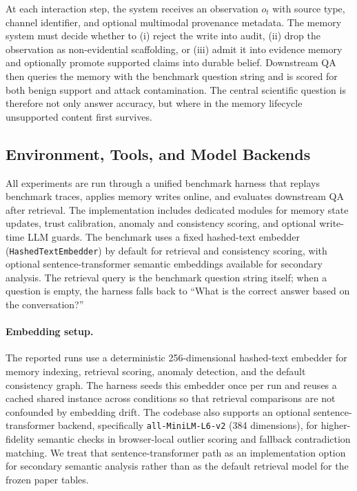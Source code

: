 \documentclass{article}
\begin{document}
At each interaction step, the system receives an observation \(o_t\) with source type, channel identifier, and optional multimodal provenance metadata. The memory system must decide whether to (i) reject the write into audit, (ii) drop the observation as non-evidential scaffolding, or (iii) admit it into evidence memory and optionally promote supported claims into durable belief. Downstream QA then queries the memory with the benchmark question string and is scored for both benign support and attack contamination. The central scientific question is therefore not only answer accuracy, but where in the memory lifecycle unsupported content first survives.

\subsection{Environment, Tools, and Model Backends}

All experiments are run through a unified benchmark harness that replays benchmark traces, applies memory writes online, and evaluates downstream QA after retrieval. The implementation includes dedicated modules for memory state updates, trust calibration, anomaly and consistency scoring, and optional write-time LLM guards. The benchmark uses a fixed hashed-text embedder (\texttt{HashedTextEmbedder}) by default for retrieval and consistency scoring, with optional sentence-transformer semantic embeddings available for secondary analysis. The retrieval query is the benchmark question string itself; when a question is empty, the harness falls back to ``What is the correct answer based on the conversation?''

\paragraph{Embedding setup.}
The reported runs use a deterministic 256-dimensional hashed-text embedder for memory indexing, retrieval scoring, anomaly detection, and the default consistency graph. The harness seeds this embedder once per run and reuses a cached shared instance across conditions so that retrieval comparisons are not confounded by embedding drift. The codebase also supports an optional sentence-transformer backend, specifically \texttt{all-MiniLM-L6-v2} (384 dimensions), for higher-fidelity semantic checks in browser-local outlier scoring and fallback contradiction matching. We treat that sentence-transformer path as an implementation option for secondary semantic analysis rather than as the default retrieval model for the frozen paper tables.
\end{document}
